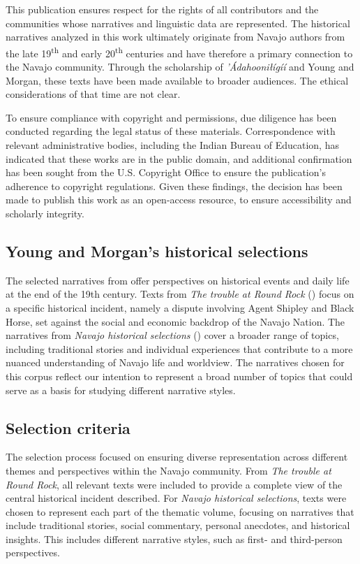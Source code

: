 This publication ensures respect for the rights of all contributors and the communities whose narratives and linguistic data are represented. The historical narratives analyzed in this work ultimately originate from Navajo authors from the late 19\textsuperscript{th} and early 20\textsuperscript{th} centuries and have therefore a primary connection to the Navajo community. Through the scholarship of \textit{’Ádahooniłígíí} and Young and Morgan, these texts have been made available to broader audiences. The ethical considerations of that time are not clear.

To ensure compliance with copyright and permissions, due diligence has been conducted regarding the legal status of these materials. Correspondence with relevant administrative bodies, including the Indian Bureau of Education, has indicated that these works are in the public domain, and additional confirmation has been sought from the U.S. Copyright Office to ensure the publication's adherence to copyright regulations. Given these findings, the decision has been made to publish this work as an open-access resource, to ensure accessibility and scholarly integrity.

\subsection{Young and Morgan's historical selections}

The selected narratives from \citet{Young:1952cy,Young:1954jz} offer perspectives on historical events and daily life at the end of the 19th century. Texts from \textit{The trouble at Round Rock} (\citeyear{Young:1952cy}) focus on a specific historical incident, namely a dispute involving Agent Shipley and Black Horse, set against the social and economic backdrop of the Navajo Nation. The narratives from \textit{Navajo historical selections} (\citeyear{Young:1954jz}) cover a broader range of topics, including traditional stories and individual experiences that contribute to a more nuanced understanding of Navajo life and worldview. The narratives chosen for this corpus reflect our intention to represent a broad number of topics that could serve as a basis for studying different narrative styles.

\subsection{Selection criteria}

The selection process focused on ensuring diverse representation across different themes and perspectives within the Navajo community. From \textit{The trouble at Round Rock}, all relevant texts were included to provide a complete view of the central historical incident described. For \textit{Navajo historical selections}, texts were chosen to represent each part of the thematic volume, focusing on narratives that include traditional stories, social commentary, personal anecdotes, and historical insights. This includes different narrative styles, such as first- and third-person perspectives.

